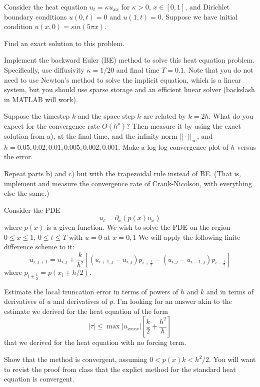 \documentclass[minion]{homework}
\begin{document}
\begin{problems}

\problem  Consider the heat equation $u_t = \kappa u_{xx}$ 
for $\kappa>0$, $x\in [0, 1]$, and Dirichlet boundary conditions $u(0, t) = 0
$ and $u(1, t) = 0$. 
Suppose we have initial condition $u(x, 0) = sin(5\pi x)$.
\begin{subproblems}
\item Find an exact solution to this problem.
\item Implement the backward Euler (BE) method
 to solve this heat equation problem. Specifically, use diffusivity $\kappa = 1/20$ and final time $T= 0.1$. Note that you do not need to use Newton's method to solve the implicit equation, which is a linear system, but you should use sparse storage and an efficient linear solver (backslash in MATLAB will work).
 \item Suppose the timestep $k$ and the space step $h$ are related by $k=2h$.
 What do you expect for the convergence rate $O(h^p)$? Then measure it by using the exact solution from a), at the final time, and the infinity norm $||\cdot||_\infty$, and $h = 0.05, 0.02, 0.01, 0.005, 0.002, 0.001$. 
  Make a log-log convergence plot of $h$ versus the error.
\item Repeat parts b) and c) but with the trapezoidal rule instead of BE. (That is, implement and measure the convergence rate of Crank-Nicolson, with everything else the same.)
\end{subproblems}

\problem Consider the PDE
\[
u_t = \partial_x(p(x) u_x)
\]
where $p(x)$ is a given function. We wish to solve the PDE
on the region $0\le x\le 1$, $0\le t\le T$ with $u=0$ at $x=0,1$
 We will apply the following
finite difference scheme to it:
\[
u_{i,j+1} = u_{i,j} + \frac{k}{h^2}[(u_{i+1,j}-u_{i,j})p_{i+\frac{1}{2}}  - 
(u_{i,j}-u_{i-1,j})p_{i-\frac{1}{2}}]
\]
where $p_{i\pm\frac{1}{2}}=p(x_i \pm h/2)$.
\begin{subproblems}
\item Estimate the local truncation error in terms of powers of $h$ and $k$ and
in terms of derivatives of $u$ and derivatives of $p$.  I'm looking for an
answer akin to the estimate we derived for the heat equation of the form
\[
|\tau| \le \max |u_{xxxx}| \left[\frac{k}{2}+\frac{h^2}{h}\right]
\]
that we derived for the heat equation with no forcing term.

\item Show that the method is convergent, assuming $0<p(x)k< h^2/2$.  You will
want to revist the proof from class that the explict method for the standard
heat equation is convergent.
\end{subproblems}


\end{problems}
\end{document}

